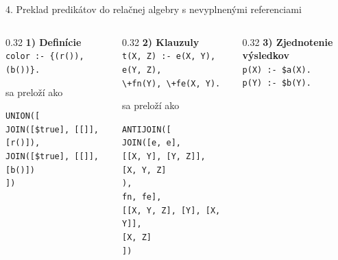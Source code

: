 \documentclass[11pt,aspectratio=169]{beamer}
\begin{document}
\begin{frame}{4. Preklad predikátov do relačnej algebry s nevyplnenými referenciami}
\scriptsize
\begin{columns}[T,onlytextwidth]
    \begin{column}{0.32\textwidth}
        \textbf{1) Definície}\\
        \texttt{color :- \{(r()), (b())\}.}
        
        \vspace{2,5em}
        sa preloží ako
        \vspace{1em}
        
        \texttt{UNION([\\
            \hspace{1em} JOIN([\$true], [[]], [r()]),\\
            \hspace{1em} JOIN([\$true], [[]], [b()])\\
            ])
        }
    \end{column}
    \begin{column}{0.32\textwidth}
        \textbf{2) Klauzuly}\\
        \texttt{t(X, Z) :- e(X, Y), e(Y, Z),\\
            \hspace{4em} \textbackslash+fn(Y), \textbackslash+fe(X, Y).
        }
        
        \vspace{1em}
        sa preloží ako
        \vspace{1em}
        
        \texttt{ANTIJOIN([\\
            \hspace{1em} JOIN([e, e], \\
            \hspace{2em} [[X, Y], [Y, Z]], \\
            \hspace{2em} [X, Y, Z]\\
            \hspace{1em} ),\\
            \hspace{1em} fn, fe],\\
            \hspace{1em} [[X, Y, Z], [Y], [X, Y]],\\
            \hspace{1em} [X, Z]\\
            ])
        }
    \end{column}
    \begin{column}{0.32\textwidth}
        \textbf{3) Zjednotenie výsledkov}\\
        \texttt{p(X) :- \$a(X).\\
            p(Y) :- \$b(Y).
        }
        

\end{column}
\end{columns}
\end{frame}
\end{document}
